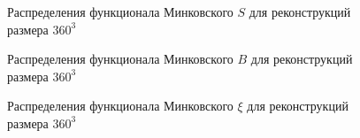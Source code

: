			\begin{figure}[h]
				\begin{minipage}[h]{0.49\linewidth}
				\end{minipage}
				\hfill
				\begin{minipage}[h]{0.49\linewidth}
				\end{minipage}
				\caption{Распределения функционала Минковского $S$ для реконструкций размера $360^3$}
				\label{5-dist-S-360}
			\end{figure}
			
			\begin{figure}[h]
				\begin{minipage}[h]{0.49\linewidth}
				\end{minipage}
				\hfill
				\begin{minipage}[h]{0.49\linewidth}
				\end{minipage}
				\caption{Распределения функционала Минковского $B$ для реконструкций размера $360^3$}
				\label{5-dist-B-360}
			\end{figure}
			
			\begin{figure}[h]
				\begin{minipage}[h]{0.49\linewidth}
				\end{minipage}
				\hfill
				\begin{minipage}[h]{0.49\linewidth}
				\end{minipage}
				\caption{Распределения функционала Минковского $\xi$ для реконструкций размера $360^3$}
				\label{5-dist-Xi-360}
			\end{figure}
		
